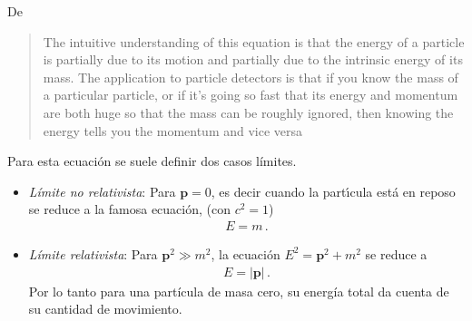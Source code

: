 De \cite{uslhcblog}
\begin{quote}
  The intuitive understanding of this equation is that the energy of a particle is partially due to its motion and partially due to the intrinsic energy of its mass.  The application to particle detectors is that if you know the mass of a particular particle, or if it’s going so fast that its energy and momentum are both huge so that the mass can be roughly ignored, then knowing the energy tells you the momentum and vice versa
\end{quote}

\begin{frame}
Para esta ecuación se suele definir dos casos límites.
\begin{itemize}
\item \emph{Límite no relativista}: Para $\mathbf{p}=0$, es decir cuando la part\'\i cula est\'a en reposo se reduce a la famosa ecuaci\'on, (con $c^2=1$)
  \begin{align}
    E=m\,.
  \end{align}

\item \emph{Límite relativista}: Para $\mathbf{p}^2\gg m^2$, la ecuación $E^2=\mathbf{p}^2+m^2$ se reduce a
  \begin{align}
    E= |\mathbf{p}|\,.
  \end{align}
Por lo tanto para una partícula de masa cero, su energía total da cuenta de su cantidad de movimiento.
\end{itemize}

\end{frame}

